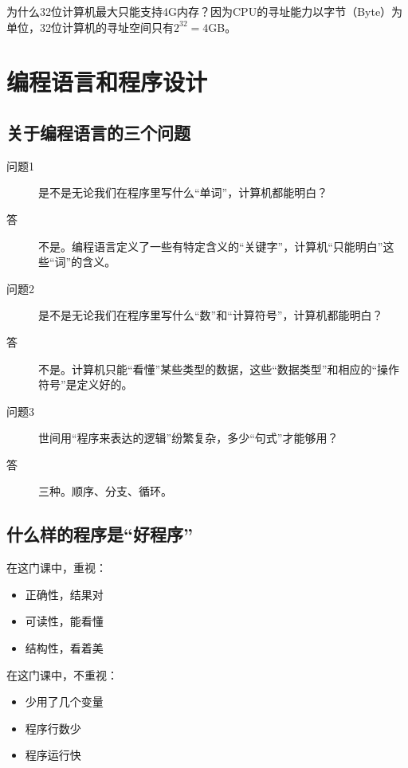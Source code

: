 \documentclass[UTF8]{ctexart}
\begin{document}
为什么32位计算机最大只能支持4G内存？因为CPU的寻址能力以字节（Byte）为单位，32位计算机的寻址空间只有$2^{32}=4$GB。

\section{编程语言和程序设计}
\subsection{关于编程语言的三个问题}
\begin{description}
    \item[问题1] 是不是无论我们在程序里写什么“单词”，计算机都能明白？
    \item[答] 不是。编程语言定义了一些有特定含义的“关键字”，计算机“只能明白”这些“词”的含义。
\end{description}

\begin{description}
    \item[问题2] 是不是无论我们在程序里写什么“数”和“计算符号”，计算机都能明白？
    \item[答] 不是。计算机只能“看懂”某些类型的数据，这些“数据类型”和相应的“操作符号”是定义好的。
\end{description}

\begin{description}
    \item[问题3] 世间用“程序来表达的逻辑”纷繁复杂，多少“句式”才能够用？
    \item[答] 三种。顺序、分支、循环。
\end{description}

\subsection{什么样的程序是“好程序”}
在这门课中，重视：
\begin{itemize}
    \item 正确性，结果对
    \item 可读性，能看懂
    \item 结构性，看着美
\end{itemize}

在这门课中，不重视：
\begin{itemize}
    \item 少用了几个变量
    \item 程序行数少
    \item 程序运行快
\end{itemize}
\end{document}
